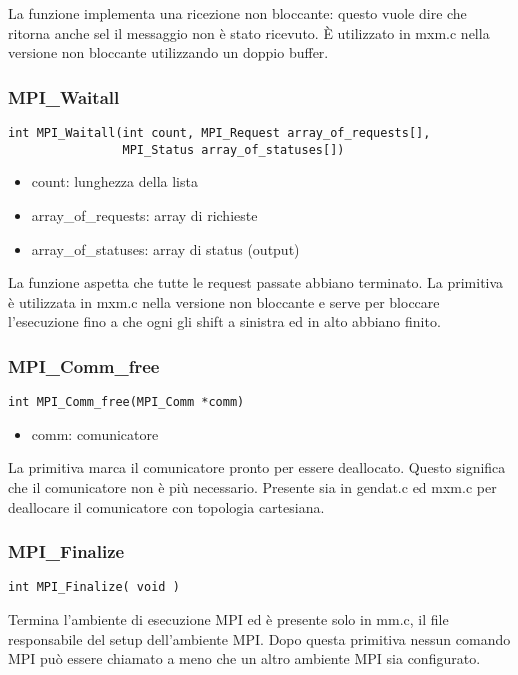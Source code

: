 La funzione implementa una ricezione non bloccante: questo vuole dire che ritorna anche sel il messaggio non \`{e} stato ricevuto. \`{E} utilizzato in mxm.c nella versione non bloccante utilizzando un doppio buffer.

\subsubsection{MPI\_Waitall}
\begin{lstlisting}
int MPI_Waitall(int count, MPI_Request array_of_requests[],
                MPI_Status array_of_statuses[])
\end{lstlisting}
\begin{itemize}
  \item count: lunghezza della lista
  \item array\_of\_requests: array di richieste
  \item array\_of\_statuses: array di status (output)
\end{itemize}

La funzione aspetta che tutte le request passate abbiano terminato. La primitiva \`{e} utilizzata in mxm.c nella versione non bloccante e serve per bloccare l'esecuzione fino a che ogni gli shift a sinistra ed in alto abbiano finito.

\subsubsection{MPI\_Comm\_free}
\begin{lstlisting}
int MPI_Comm_free(MPI_Comm *comm)
\end{lstlisting}
\begin{itemize}
  \item comm: comunicatore
\end{itemize}

La primitiva marca il comunicatore pronto per essere deallocato. Questo significa che il comunicatore non \`{e} pi\`{u} necessario. Presente sia in gendat.c ed mxm.c per deallocare il comunicatore con topologia cartesiana.

\subsubsection{MPI\_Finalize}
\begin{lstlisting}
int MPI_Finalize( void )
\end{lstlisting}

Termina l'ambiente di esecuzione MPI ed \`{e} presente solo in mm.c, il file responsabile del setup dell'ambiente MPI. Dopo questa primitiva nessun comando MPI pu\`{o} essere chiamato a meno che un altro ambiente MPI sia configurato.

